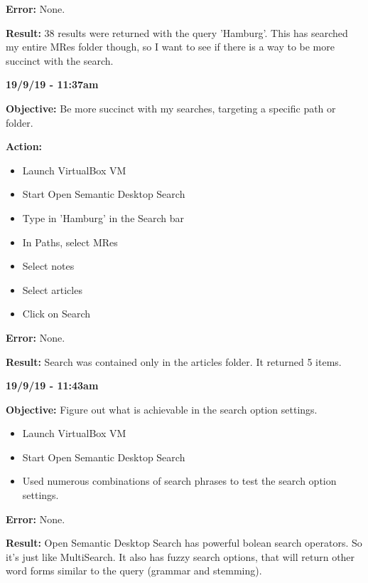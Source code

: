 \documentclass{article}
\begin{document}
\textbf{Error:} None.

\textbf{Result:} 38 results were returned with the query 'Hamburg'. This has searched my entire MRes folder though, so I want to see if there is a way to be more succinct with the search.

\textbf{19/9/19 - 11:37am}

\textbf{Objective:} Be more succinct with my searches, targeting a specific path or folder.

\textbf{Action:}
\begin{itemize}
    \item Launch VirtualBox VM
    \item Start Open Semantic Desktop Search
    \item Type in 'Hamburg' in the Search bar
    \item In Paths, select MRes
    \item Select notes
    \item Select articles
    \item Click on Search
\end{itemize}

\textbf{Error:} None.

\textbf{Result:} Search was contained only in the articles folder. It returned 5 items.

\textbf{19/9/19 - 11:43am}

\textbf{Objective:} Figure out what is achievable in the search option settings.

\begin{itemize}
    \item Launch VirtualBox VM
    \item Start Open Semantic Desktop Search
    \item Used numerous combinations of search phrases to test the search option settings.
\end{itemize}

\textbf{Error:} None.

\textbf{Result:} Open Semantic Desktop Search has powerful bolean search operators. So it's just like MultiSearch. It also has fuzzy search options, that will return other word forms similar to the query (grammar and stemming).
\end{document}
